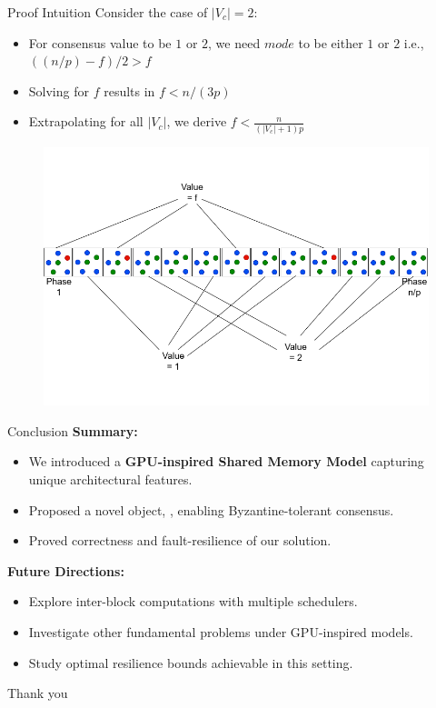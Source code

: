 \documentclass{beamer}
\begin{document}
\begin{frame}{Proof Intuition}
Consider the case of $|V_c|=2$:
\begin{itemize}
    \item For consensus value to be $1$ or $2$, we need $mode$ to be either $1$ or $2$ i.e., $((n/p)-f)/2 > f$
    \item Solving for $f$ results in $f < n/(3p)$
    \item Extrapolating for all $|V_c|$, we derive $f< \frac{n}{(|V_c|+1)p}$
\end{itemize}
\vspace{-2em}
\begin{figure}[t]
\centering
\includegraphics[scale=0.35]{proof4.png}
\end{figure}
\end{frame}





\begin{frame}{Conclusion}
\textbf{Summary:}
\begin{itemize}
  \item We introduced a \textbf{GPU-inspired Shared Memory Model} capturing unique architectural features.  
  \item Proposed a novel object, \textbf{\BVCAS}, enabling Byzantine-tolerant consensus.  
  \item Proved correctness and fault-resilience of our solution.  
\end{itemize}

\medskip
\textbf{Future Directions:}
\begin{itemize}
  \item Explore inter-block computations with multiple schedulers.  
  \item Investigate other fundamental problems under GPU-inspired models.  
  \item Study optimal resilience bounds achievable in this setting.  
\end{itemize}
\end{frame}


\begin{frame}
\vspace{2mm}
\centering
\Huge Thank you
\end{frame}



\end{document}

